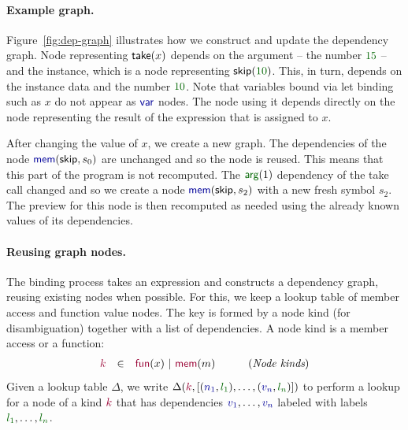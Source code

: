 \documentclass[sigplan,10pt]{acmart}\settopmatter{printfolios=true,printccs=false,printacmref=false}
\theoremstyle{plain}
\theoremstyle{definition}
\newcommand{\num}[1]{\textcolor{numclr}{#1}}
\newcommand{\ident}[1]{\textnormal{\sffamily #1}}
\newcommand{\kvd}[1]{\textnormal{\textcolor{kvdclr}{\sffamily #1}}}
\newcommand{\bndclr}[1]{\textcolor{kvdclr}{#1}}
\newcommand{\bkndclr}[1]{\textcolor{prepclr}{#1}}
\newcommand{\blblclr}[1]{\textcolor{numclr}{#1}}
\newcommand{\bnd}[1]{\textnormal{\textcolor{kvdclr}{\sffamily #1}}}
\newcommand{\bknd}[1]{\textnormal{\textcolor{prepclr}{\sffamily #1}}}
\newcommand{\blbl}[1]{\textnormal{\textcolor{numclr}{\sffamily #1}}}
\begin{document}
\paragraph{Example graph.} Figure~\ref{fig:dep-graph} illustrates how we construct and update the 
dependency graph. Node representing $\ident{take}(x)$ depends on the argument -- the
number $\num{15}$ -- and the instance, which is a node representing $\ident{skip}(\num{10})$.
This, in turn, depends on the instance \ident{data} and the number $\num{10}$. Note that variables
bound via \kvd{let} binding such as $x$ do not appear as $\bnd{var}$ nodes. The node using it
depends directly on the node representing the result of the expression that is assigned to $x$.

After changing the value of $x$, we create a new graph. The dependencies of the node 
$\bnd{mem}(\ident{skip}, s_0)$ are unchanged and so the node is reused. This means that this
part of the program is not recomputed. The $\blbl{arg}(1)$ dependency of the \ident{take} call 
changed and so we create a node $\bnd{mem}(\ident{skip}, s_2)$ with a new fresh symbol $s_2$.
The preview for this node is then recomputed as needed using the already known values of its
dependencies.


\paragraph{Reusing graph nodes.} The binding process takes an expression and constructs a 
dependency graph, reusing existing nodes when possible. For this, we keep a lookup table 
of member access and function value nodes. The key is formed by a node kind (for 
disambiguation) together with a list of dependencies. A node kind is a member access or a function:
%
\begin{equation*}
\begin{array}{lcll}
\bkndclr{k}&\in&\bknd{fun}(x)~|~\bknd{mem}(m)&\qquad(\textit{Node  kinds})
\end{array}
\end{equation*}
%
Given a lookup table $\Delta$, we write $\Delta(\bkndclr{k}, [(\bndclr{n_1},\blblclr{l_1}), \ldots,
(\bndclr{v_n},\blblclr{l_n})])$ to perform a lookup for a node of a kind $\bkndclr{k}$ that has dependencies
$\bndclr{v_1}, \ldots, \bndclr{v_n}$ labeled with labels $\blblclr{l_1}, \ldots, \blblclr{l_n}$.
\end{document}
